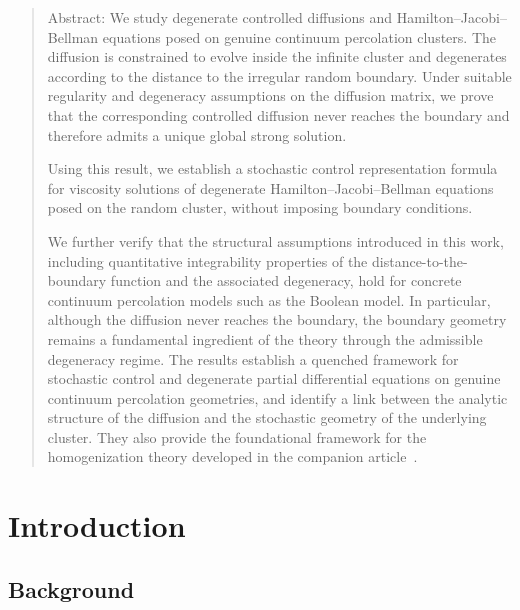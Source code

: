 \documentclass[11pt]{article}
\theoremstyle{rem}
\begin{document}
\begin{quote}{\small {Abstract: We study degenerate controlled diffusions and
Hamilton--Jacobi--Bellman equations posed on genuine continuum percolation
clusters. The
diffusion is constrained to evolve inside the infinite cluster and degenerates
according to the distance to the irregular random boundary. Under
suitable regularity and degeneracy assumptions on the diffusion matrix, we
prove that the corresponding controlled diffusion never reaches the boundary
and therefore admits a unique global strong solution.

Using this result, we establish a stochastic control representation formula
for viscosity solutions of degenerate Hamilton--Jacobi--Bellman equations
posed on the random cluster, without imposing boundary conditions.

We further verify that the structural assumptions introduced in this work,
including quantitative integrability properties of the
distance-to-the-boundary function and the associated degeneracy, hold for
concrete continuum percolation models such as the Boolean model. In
particular, although the diffusion never reaches the boundary, the boundary
geometry remains a fundamental ingredient of the theory through the admissible
degeneracy regime. The results establish a quenched framework for stochastic
control and degenerate partial differential equations on genuine continuum
percolation geometries, and identify a link between the analytic structure of
the diffusion and the stochastic geometry of the underlying cluster. They also
provide the foundational framework for the homogenization theory developed in
the companion article~\cite{BMM26}.}
}


\end{quote}






\tableofcontents 



\section{Introduction}\label{sec-intro}

\subsection{Background}\label{subsec background}
\end{document}
